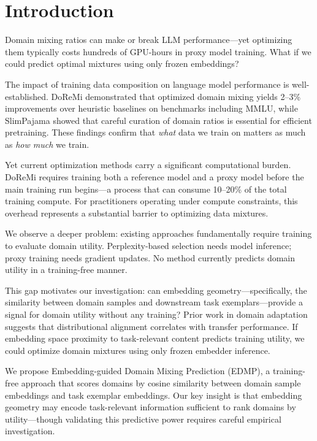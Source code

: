 \section{Introduction}

Domain mixing ratios can make or break LLM performance---yet optimizing them typically costs hundreds of GPU-hours in proxy model training. What if we could predict optimal mixtures using only frozen embeddings?

The impact of training data composition on language model performance is well-established. DoReMi \cite{xie2023doremi} demonstrated that optimized domain mixing yields 2--3\% improvements over heuristic baselines on benchmarks including MMLU, while SlimPajama \cite{soboleva2023slimpajama} showed that careful curation of domain ratios is essential for efficient pretraining. These findings confirm that \emph{what} data we train on matters as much as \emph{how much} we train.

Yet current optimization methods carry a significant computational burden. DoReMi requires training both a reference model and a proxy model before the main training run begins---a process that can consume 10--20\% of the total training compute. For practitioners operating under compute constraints, this overhead represents a substantial barrier to optimizing data mixtures.

We observe a deeper problem: existing approaches fundamentally require training to evaluate domain utility. Perplexity-based selection needs model inference; proxy training needs gradient updates. No method currently predicts domain utility in a training-free manner.

This gap motivates our investigation: can embedding geometry---specifically, the similarity between domain samples and downstream task exemplars---provide a signal for domain utility without any training? Prior work in domain adaptation \cite{xie2023dsir} suggests that distributional alignment correlates with transfer performance. If embedding space proximity to task-relevant content predicts training utility, we could optimize domain mixtures using only frozen embedder inference.

We propose Embedding-guided Domain Mixing Prediction (EDMP), a training-free approach that scores domains by cosine similarity between domain sample embeddings and task exemplar embeddings. Our key insight is that embedding geometry may encode task-relevant information sufficient to rank domains by utility---though validating this predictive power requires careful empirical investigation.

